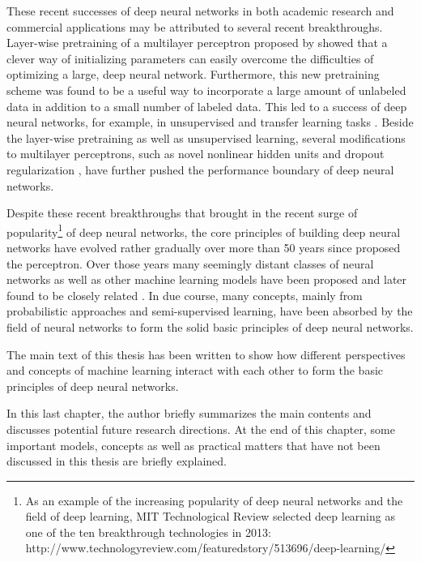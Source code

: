 \documentclass{now}
\begin{document}
These recent successes of deep neural networks in both
academic research and commercial applications may be
attributed to several recent breakthroughs. Layer-wise
pretraining of a multilayer perceptron proposed by
\citep{Hinton2006,Bengio2007nips,Ranzato2007} showed that a
clever way of initializing parameters can easily overcome
the difficulties of optimizing a large, deep neural network.
Furthermore, this new pretraining scheme was found to be a
useful way to incorporate a large amount of unlabeled data
in addition to a small number of labeled data. This led to a
success of deep neural networks, for example, in
unsupervised and transfer learning tasks \citep[see,
e.g.,][]{Guyon2011,Mesnil2012,Raina2007}. Beside the
layer-wise pretraining as well as unsupervised learning,
several modifications to multilayer perceptrons, such as
novel nonlinear hidden units \citep[see,
e.g.,][]{Nair2010,Glorot2011,Goodfellow2013} and dropout
regularization \citep{Hinton2012}, have further pushed the
performance boundary of deep neural networks. 

Despite these recent breakthroughs that brought in the
recent surge of popularity\footnote{As an example of the
increasing popularity of deep neural networks and the field
of deep learning, MIT Technological Review selected deep
learning as one of the ten breakthrough technologies in
2013:
\\http://www.technologyreview.com/featuredstory/513696/deep-learning/
} of deep neural networks, the core principles of building
deep neural networks have evolved rather gradually over more
than 50 years since \citet{Rosenblatt1958} proposed the
perceptron. Over those years many seemingly distant classes
of neural networks as well as other machine learning models
have been proposed and later found to be closely related
\citep[see, e.g.,][]{Haykin2009}. In due course, many
concepts, mainly from probabilistic approaches and
semi-supervised learning, have been absorbed by the field of
neural networks to form the solid basic principles of deep
neural networks.

The main text of this thesis has been written to show how
different perspectives and concepts of machine learning
interact with each other to form the basic principles of deep
neural networks. 

In this last chapter, the author briefly summarizes the main
contents and discusses potential future
research directions. At the end of this chapter, some
important models, concepts as well as practical matters that
have not been discussed in this thesis are briefly
explained.
\end{document}
